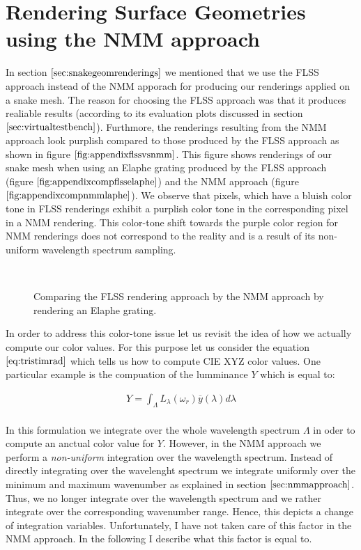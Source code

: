 \chapter{Rendering Surface Geometries using the NMM approach}
\label{chap:diffflssnmm}

In section $\ref{sec:snakegeomrenderings}$ we mentioned that we use the FLSS approach instead of the NMM apporach for producing our renderings applied on a snake mesh. The reason for choosing the FLSS approach was that it produces realiable results (according to its evaluation plots discussed in section $\ref{sec:virtualtestbench}$). Furthmore, the renderings resulting from the NMM approach look purplish compared to those produced by the FLSS approach as shown in figure $\ref{fig:appendixflssvsnmm}$. This figure shows renderings of our snake mesh when using an Elaphe grating produced by the FLSS approach (figure $\ref{fig:appendixcompflsselaphe}$) and the NMM approach (figure $\ref{fig:appendixcompnmmlaphe}$). We observe that pixels, which have a bluish color tone in FLSS renderings exhibit a purplish color tone in the corresponding pixel in a NMM rendering. This color-tone shift towards the purple color region for NMM renderings does not correspond to the reality and is a result of its non-uniform wavelength spectrum sampling. 

\begin{figure}[H]
  \centering
~
~
\caption[Comparing NMM Approach with FLSS Approach]{Comparing the FLSS rendering approach by the NMM approach by rendering an Elaphe grating.}
\label{fig:appendixflssvsnmm}
\end{figure}

In order to address this color-tone issue let us revisit the idea of how we actually compute our color values. For this purpose let us consider the equation $\ref{eq:tristimrad}$ which tells us how to compute CIE XYZ color values. One particular example is the compuation of the lumminance $Y$ which is equal to:

\begin{align}
Y = \int_{\Lambda}L_\lambda(\omega_r)\overline{y}(\lambda)d\lambda \nonumber \\
\end{align}

In this formulation we integrate over the whole wavelength spectrum $\Lambda$ in oder to compute an anctual color value for $Y$. However, in the NMM approach we perform a \emph{non-uniform} integration over the wavelength spectrum. Instead of directly integrating over the wavelenght spectrum we integrate uniformly over the minimum and maximum wavenumber as explained in section $\ref{sec:nmmapproach}$. Thus, we no longer integrate over the wavelength spectrum and we rather integrate over the corresponding wavenumber range. Hence, this depicts a change of integration variables. Unfortunately, I have not taken care of this factor in the NMM approach. In the following I describe what this factor is equal to. \\

